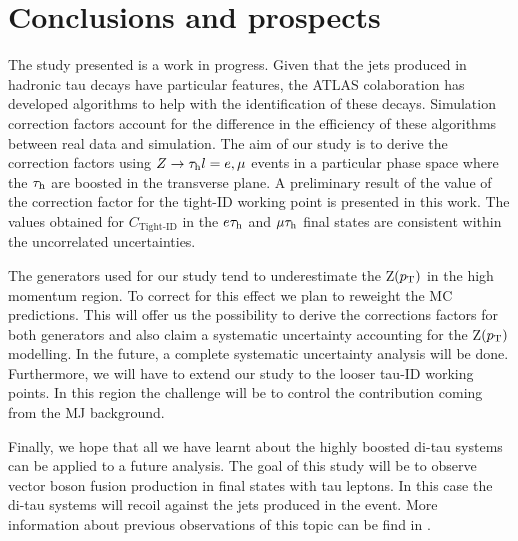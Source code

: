 \chapter{Conclusions and prospects}\label{chap6}
The study presented is a work in progress. Given that the jets produced in hadronic tau decays have particular features, the ATLAS colaboration has developed algorithms to help with the identification of these decays. Simulation correction factors account for the difference in the efficiency of these algorithms between real data and simulation. The aim of our study is to derive the correction factors using $Z\to\tau_\text{h} l=e,\mu$ events in a particular phase space where the $\tau_\text{h}$ are boosted in the transverse plane. A preliminary result of the value of the correction factor for the tight-ID working point is presented in this work. The values obtained for $C_{\text{Tight-ID}}$ in the $e\tau_\text{h}$ and $\mu\tau_\text{h}$ final states are consistent within the uncorrelated uncertainties.

The generators used for our study tend to underestimate the Z$(p_\text{T})$ in the high momentum region. To correct for this effect we plan to reweight the MC predictions. This will offer us the possibility to derive the corrections factors for both generators and also claim a systematic uncertainty accounting for the Z$(p_\text{T})$ modelling. In the future, a complete systematic uncertainty analysis will be done. Furthermore, we will have to extend our study to the looser tau-ID working points. In this region the challenge will be to control the contribution coming from the MJ background. 

Finally, we hope that all we have learnt about the highly boosted di-tau systems can be applied to a future analysis.  The goal of this study will be to observe vector boson fusion production in final states with tau leptons. In this case the di-tau systems will recoil against the jets produced in the event. More information about previous observations of this topic can be find in \cite{Aad:2014dta,Aaboud:2017emo}. 

